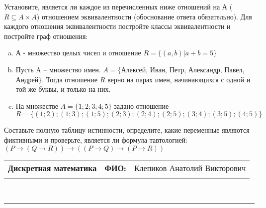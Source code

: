 \documentclass[10pt]{exam}
\newcommand{\class}{Дискретная математика}
\newcommand{\examdate}{}
\begin{document}
\begin{questions}
\question
Установите, является ли каждое из перечисленных ниже отношений на А ($R \subseteq A \times A$) отношением эквивалентности (обоснование ответа обязательно). Для каждого отношения эквивалентности постройте классы 
эквивалентности и постройте граф отношения:
\begin{enumerate} [a)]\setcounter{enumi}{0}
\item А - множество целых чисел и отношение $R = \{(a,b)|a + b = 5\}$
\item Пусть A – множество имен. $A = \{ $Алексей, Иван, Петр, Александр, Павел, Андрей$ \}$. Тогда отношение $R $ верно на парах имен, начинающихся с одной и той же буквы, и только на них.
\item На множестве $A = \{1; 2; 3; 4; 5\}$ задано отношение $R = \{(1; 2); (1; 3); (1; 5); (2; 3); (2; 4); (2; 5); (3; 4); (3; 5); (4; 5)\}$
\end{enumerate}\question Составьте полную таблицу истинности, определите, какие переменные являются фиктивными и проверьте, является ли формула тавтологией:
$(P \rightarrow (Q \rightarrow R)) \rightarrow ((P \rightarrow Q) \rightarrow (P \rightarrow R))$

\end{questions}
\newpage
\begin{flushright}
\begin{tabular}{p{2.8in} r l}
\textbf{\class} & \textbf{ФИО:} &Клепиков Анатолий Викторович
\\

\textbf{\examdate} &&\\
\end{tabular}\\
\end{flushright}
\rule[1ex]{\textwidth}{.1pt}
\end{document}
